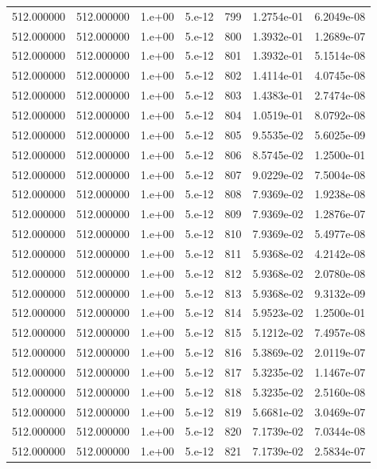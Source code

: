 \begin{table}[htbp]
\begin{tabular}{rrrrrrr}
512.000000 & 512.000000 & 1.e+00 & 5.e-12 & 799 & 1.2754e-01 & 6.2049e-08 \\
512.000000 & 512.000000 & 1.e+00 & 5.e-12 & 800 & 1.3932e-01 & 1.2689e-07 \\
512.000000 & 512.000000 & 1.e+00 & 5.e-12 & 801 & 1.3932e-01 & 5.1514e-08 \\
512.000000 & 512.000000 & 1.e+00 & 5.e-12 & 802 & 1.4114e-01 & 4.0745e-08 \\
512.000000 & 512.000000 & 1.e+00 & 5.e-12 & 803 & 1.4383e-01 & 2.7474e-08 \\
512.000000 & 512.000000 & 1.e+00 & 5.e-12 & 804 & 1.0519e-01 & 8.0792e-08 \\
512.000000 & 512.000000 & 1.e+00 & 5.e-12 & 805 & 9.5535e-02 & 5.6025e-09 \\
512.000000 & 512.000000 & 1.e+00 & 5.e-12 & 806 & 8.5745e-02 & 1.2500e-01 \\
512.000000 & 512.000000 & 1.e+00 & 5.e-12 & 807 & 9.0229e-02 & 7.5004e-08 \\
512.000000 & 512.000000 & 1.e+00 & 5.e-12 & 808 & 7.9369e-02 & 1.9238e-08 \\
512.000000 & 512.000000 & 1.e+00 & 5.e-12 & 809 & 7.9369e-02 & 1.2876e-07 \\
512.000000 & 512.000000 & 1.e+00 & 5.e-12 & 810 & 7.9369e-02 & 5.4977e-08 \\
512.000000 & 512.000000 & 1.e+00 & 5.e-12 & 811 & 5.9368e-02 & 4.2142e-08 \\
512.000000 & 512.000000 & 1.e+00 & 5.e-12 & 812 & 5.9368e-02 & 2.0780e-08 \\
512.000000 & 512.000000 & 1.e+00 & 5.e-12 & 813 & 5.9368e-02 & 9.3132e-09 \\
512.000000 & 512.000000 & 1.e+00 & 5.e-12 & 814 & 5.9523e-02 & 1.2500e-01 \\
512.000000 & 512.000000 & 1.e+00 & 5.e-12 & 815 & 5.1212e-02 & 7.4957e-08 \\
512.000000 & 512.000000 & 1.e+00 & 5.e-12 & 816 & 5.3869e-02 & 2.0119e-07 \\
512.000000 & 512.000000 & 1.e+00 & 5.e-12 & 817 & 5.3235e-02 & 1.1467e-07 \\
512.000000 & 512.000000 & 1.e+00 & 5.e-12 & 818 & 5.3235e-02 & 2.5160e-08 \\
512.000000 & 512.000000 & 1.e+00 & 5.e-12 & 819 & 5.6681e-02 & 3.0469e-07 \\
512.000000 & 512.000000 & 1.e+00 & 5.e-12 & 820 & 7.1739e-02 & 7.0344e-08 \\
512.000000 & 512.000000 & 1.e+00 & 5.e-12 & 821 & 7.1739e-02 & 2.5834e-07 \\

\end{tabular}
\end{table}

